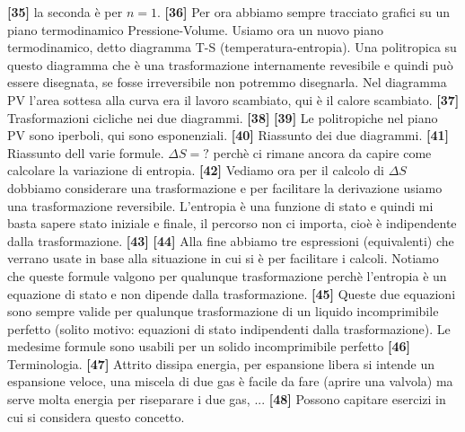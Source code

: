 \newline\textbf{[35]}\; la seconda è per $n = 1$.
\newline\textbf{[36]}\; Per ora abbiamo sempre tracciato grafici su un piano termodinamico Pressione-Volume. Usiamo ora un nuovo piano termodinamico, detto diagramma T-S (temperatura-entropia). Una politropica su questo diagramma che è una trasformazione internamente revesibile e quindi può essere disegnata, se fosse irreversibile non potremmo disegnarla. Nel diagramma PV l'area sottesa alla curva era il lavoro scambiato, qui è il calore scambiato.
\newline\textbf{[37]}\; Trasformazioni cicliche nei due diagrammi.
\newline\textbf{[38]}\;  
\newline\textbf{[39]}\; Le politropiche nel piano PV sono iperboli, qui sono esponenziali.
\newline\textbf{[40]}\; Riassunto dei due diagrammi. 
\newline\textbf{[41]}\; Riassunto dell varie formule. $\Delta S = ?$ perchè ci rimane ancora da capire come calcolare la variazione di entropia.
\newline\textbf{[42]}\; Vediamo ora per il calcolo di $\Delta S$ dobbiamo considerare una trasformazione e per facilitare la derivazione usiamo una trasformazione reversibile. L'entropia è una funzione di stato e quindi mi basta sapere stato iniziale e finale, il percorso non ci importa, cioè è indipendente dalla trasformazione. 
\newline\textbf{[43]}\;  
\newline\textbf{[44]}\; Alla fine abbiamo tre espressioni (equivalenti) che verrano usate in base alla situazione in cui si è per facilitare i calcoli. Notiamo che queste formule valgono per qualunque trasformazione perchè l'entropia è un equazione di stato e non dipende dalla trasformazione.
\newline\textbf{[45]}\; Queste due equazioni sono sempre valide per qualunque trasformazione di un liquido incomprimibile perfetto (solito motivo: equazioni di stato indipendenti dalla trasformazione). Le medesime formule sono usabili per un solido incomprimibile perfetto 
\newline\textbf{[46]}\; Terminologia.
\newline\textbf{[47]}\; Attrito dissipa energia, per espansione libera si intende un espansione veloce, una miscela di due gas è facile da fare (aprire una valvola) ma serve molta energia per riseparare i due gas, ...
\newline\textbf{[48]}\; Possono capitare esercizi in cui si considera questo concetto.
